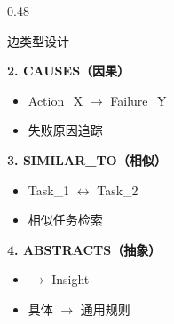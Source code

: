 \documentclass[aspectratio=169,10pt]{beamer}
\begin{document}
\begin{frame}
\begin{columns}[T]
\begin{column}{0.48\textwidth}
\begin{block}{边类型设计}
        \vspace{0.15cm}

        \textbf{2. CAUSES（因果）}
        \begin{itemize}
          \item Action\_X $\rightarrow$ Failure\_Y
          \item 失败原因追踪
        \end{itemize}

        \vspace{0.15cm}

        \textbf{3. SIMILAR\_TO（相似）}
        \begin{itemize}
          \item Task\_1 $\leftrightarrow$ Task\_2
          \item 相似任务检索
        \end{itemize}

        \vspace{0.15cm}

        \textbf{4. ABSTRACTS（抽象）}
        \begin{itemize}
          \item [Actions] $\rightarrow$ Insight
          \item 具体 $\rightarrow$ 通用规则
        \end{itemize}
      \end{block}
    \end{column}
  \end{columns}
\end{frame}
\end{document}

